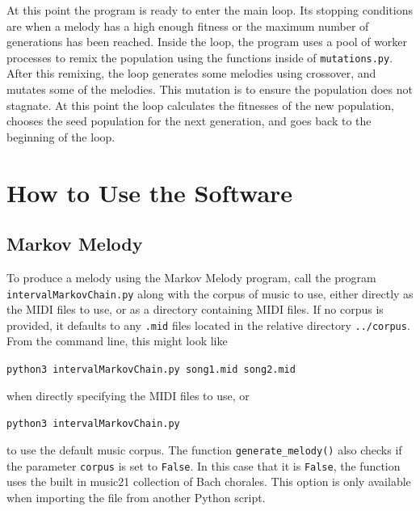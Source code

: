 At this point the program is ready to enter the main loop.
Its stopping conditions are when a melody has a high enough fitness or the maximum number of generations has been reached.
Inside the loop, the program uses a pool of worker processes to remix the population using the functions inside of \texttt{mutations.py}.
After this remixing, the loop generates some melodies using crossover, and mutates some of the melodies.
This mutation is to ensure the population does not stagnate.
At this point the loop calculates the fitnesses of the new population, chooses the seed population for the next generation, and goes back to the beginning of the loop.

\section{How to Use the Software} \label{software:howtouse}

\subsection{Markov Melody} \label{software:howtouse:markov}

To produce a melody using the Markov Melody program, call the program \texttt{intervalMarkovChain.py} along with the corpus of music to use, either directly as the MIDI files to use, or as a directory containing MIDI files.
If no corpus is provided, it defaults to any \texttt{.mid} files located in the relative directory \texttt{../corpus}.
From the command line, this might look like

\texttt{python3 intervalMarkovChain.py song1.mid song2.mid}

\noindent when directly specifying the MIDI files to use, or

\texttt{python3 intervalMarkovChain.py}

\noindent to use the default music corpus.
The function \texttt{generate\_melody()} also checks if the parameter \texttt{corpus} is set to \texttt{False}.
In this case that it is \texttt{False}, the function uses the built in music21 collection of Bach chorales.
This option is only available when importing the file from another Python script.


